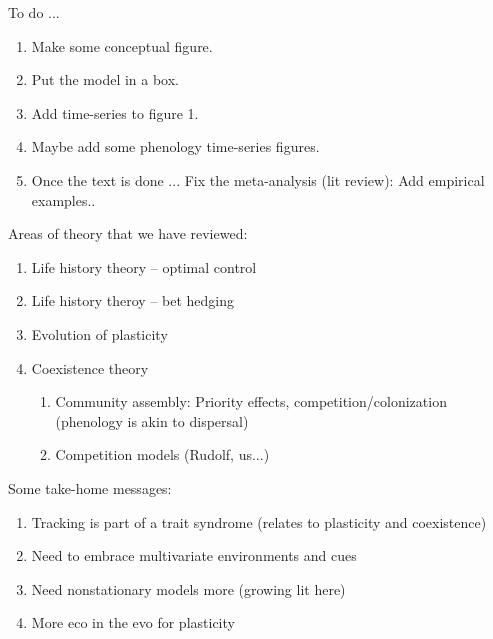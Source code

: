 \documentclass[11pt,letterpaper]{article}
\begin{document}
To do ...
\begin{enumerate}
\item Make some conceptual figure. 
\item Put the model in a box.
\item Add time-series to figure 1.
\item Maybe add some phenology time-series figures. 
\item Once the text is done ... Fix the meta-analysis (lit review): Add empirical examples.. 
\end{enumerate}


Areas of theory that we have reviewed:
\begin{enumerate}
\item Life history theory -- optimal control 
\item Life history theroy -- bet hedging
\item Evolution of plasticity
\item Coexistence theory
\begin{enumerate}
\item Community assembly: Priority effects, competition/colonization (phenology is akin to dispersal)
\item Competition models (Rudolf, us...)
\end{enumerate}
\end{enumerate}

Some take-home messages:
\begin{enumerate}
\item Tracking is part of a trait syndrome (relates to plasticity and coexistence)
\item Need to embrace multivariate environments and cues
\item Need nonstationary models more (growing lit here)
\item More eco in the evo for plasticity
\end{enumerate}
\end{document}
